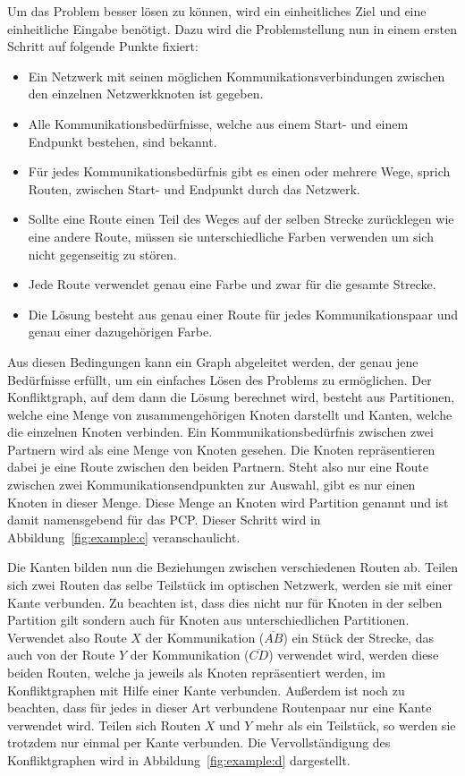 Um das Problem besser lösen zu können, wird ein einheitliches Ziel und eine einheitliche Eingabe benötigt. Dazu wird die Problemstellung nun in einem ersten Schritt auf folgende Punkte fixiert:
\begin{itemize}
	\item Ein Netzwerk mit seinen möglichen Kommunikationsverbindungen zwischen den einzelnen Netzwerkknoten ist gegeben.
	\item Alle Kommunikationsbedürfnisse, welche aus einem Start- und einem Endpunkt bestehen, sind bekannt.
	\item Für jedes Kommunikationsbedürfnis gibt es einen oder mehrere Wege, sprich Routen, zwischen Start- und Endpunkt durch das Netzwerk.
	\item Sollte eine Route einen Teil des Weges auf der selben Strecke zurücklegen wie eine andere Route, müssen sie unterschiedliche Farben verwenden um sich nicht gegenseitig zu stören.
	\item Jede Route verwendet genau eine Farbe und zwar für die gesamte Strecke.
	\item Die Lösung besteht aus genau einer Route für jedes Kommunikationspaar und genau einer dazugehörigen Farbe.
\end{itemize}

Aus diesen Bedingungen kann ein Graph abgeleitet werden, der genau jene Bedürfnisse erfüllt, um ein einfaches Lösen des Problems zu ermöglichen. Der Konfliktgraph, auf dem dann die Lösung berechnet wird, besteht aus Partitionen, welche eine Menge von zusammengehörigen Knoten darstellt und Kanten, welche die einzelnen Knoten verbinden. Ein Kommunikationsbedürfnis zwischen zwei Partnern wird als eine Menge von Knoten gesehen. Die Knoten repräsentieren dabei je eine Route zwischen den beiden Partnern. Steht also nur eine Route zwischen zwei Kommunikationsendpunkten zur Auswahl, gibt es nur einen Knoten in dieser Menge. Diese Menge an Knoten wird Partition genannt und ist damit namensgebend für das PCP\@. Dieser Schritt wird in Abbildung~\ref{fig:example:c} veranschaulicht.

Die Kanten bilden nun die Beziehungen zwischen verschiedenen Routen ab. Teilen sich zwei Routen das selbe Teilstück im optischen Netzwerk, werden sie mit einer Kante verbunden. Zu beachten ist, dass dies nicht nur für Knoten in der selben Partition gilt sondern auch für Knoten aus unterschiedlichen Partitionen. Verwendet also Route $X$ der Kommunikation ($\overline{AB}$) ein Stück der Strecke, das auch von der Route $Y$ der Kommunikation ($\overline{CD}$) verwendet wird, werden diese beiden Routen, welche ja jeweils als Knoten repräsentiert werden, im Konfliktgraphen mit Hilfe einer Kante verbunden. Außerdem ist noch zu beachten, dass für jedes in dieser Art verbundene Routenpaar nur eine Kante verwendet wird. Teilen sich Routen $X$ und $Y$ mehr als ein Teilstück, so werden sie trotzdem nur einmal per Kante verbunden. Die Vervollständigung des Konfliktgraphen wird in Abbildung~\ref{fig:example:d} dargestellt.

